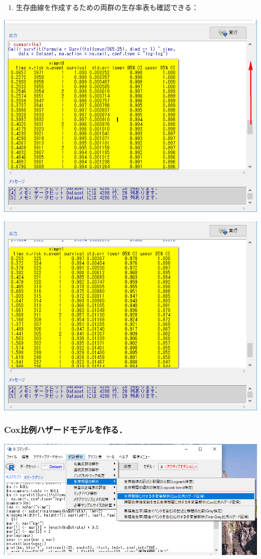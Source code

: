\documentclass[11pt,]{problemset}
\providecommand{\tightlist}{%
  \setlength{\itemsep}{0pt}\setlength{\parskip}{0pt}}
\begin{document}
\newpage

\begin{enumerate}
\def\labelenumi{\arabic{enumi}.}
\setcounter{enumi}{4}
\tightlist
\item
  生存曲線を作成するための両群の生存率表も確認できる：
\end{enumerate}

\begin{center}\includegraphics[width=0.6\linewidth,height=0.4\textheight]{pic/survival11} \end{center}

\begin{center}\includegraphics[width=0.6\linewidth,height=0.4\textheight]{pic/survival12} \end{center}

\hypertarget{cox}{%
\subsubsection{Cox比例ハザードモデルを作る．}\label{cox}}

\begin{center}\includegraphics[width=0.6\linewidth,height=0.4\textheight]{pic/survival13} \end{center}
\end{document}
